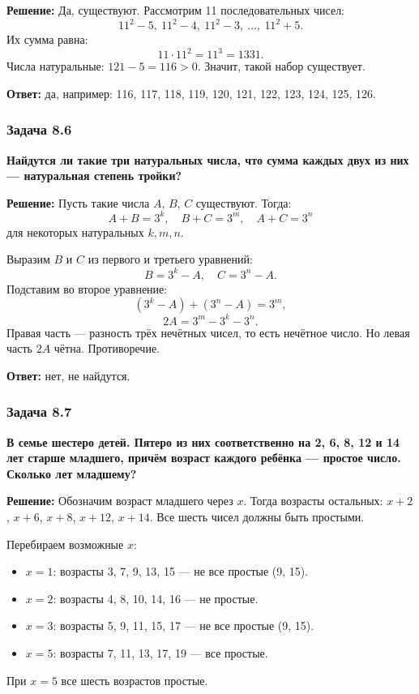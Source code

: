\documentclass[12pt, a4paper]{article}
\begin{document}
\textbf{Решение:}
Да, существуют. Рассмотрим 11 последовательных чисел:
\[
11^2 - 5,\ 11^2 - 4,\ 11^2 - 3,\ \ldots,\ 11^2 + 5.
\]
Их сумма равна:
\[
11 \cdot 11^2 = 11^3 = 1331.
\]
Числа натуральные: $121 - 5 = 116 > 0$. Значит, такой набор существует.

\textbf{Ответ:} да, например: 116, 117, 118, 119, 120, 121, 122, 123, 124, 125, 126.

\subsubsection*{Задача 8.6}
\textbf{Найдутся ли такие три натуральных числа, что сумма каждых двух из них — натуральная степень тройки?}

\textbf{Решение:}
Пусть такие числа $A$, $B$, $C$ существуют. Тогда:
\[
A + B = 3^k, \quad B + C = 3^m, \quad A + C = 3^n
\]
для некоторых натуральных $k, m, n$.

Выразим $B$ и $C$ из первого и третьего уравнений:
\[
B = 3^k - A, \quad C = 3^n - A.
\]
Подставим во второе уравнение:
\[
(3^k - A) + (3^n - A) = 3^m,
\]
\[
2A = 3^m - 3^k - 3^n.
\]
Правая часть — разность трёх нечётных чисел, то есть нечётное число. Но левая часть $2A$ чётна. Противоречие.

\textbf{Ответ:} нет, не найдутся.

\subsubsection*{Задача 8.7}
\textbf{В семье шестеро детей. Пятеро из них соответственно на 2, 6, 8, 12 и 14 лет старше младшего, причём возраст каждого ребёнка — простое число. Сколько лет младшему?}

\textbf{Решение:}
Обозначим возраст младшего через $x$. Тогда возрасты остальных: $x+2$, $x+6$, $x+8$, $x+12$, $x+14$. Все шесть чисел должны быть простыми.

Перебираем возможные $x$:
\begin{itemize}
    \item $x = 1$: возрасты 3, 7, 9, 13, 15 — не все простые (9, 15).
    \item $x = 2$: возрасты 4, 8, 10, 14, 16 — не простые.
    \item $x = 3$: возрасты 5, 9, 11, 15, 17 — не все простые (9, 15).
    \item $x = 5$: возрасты 7, 11, 13, 17, 19 — все простые.
\end{itemize}
При $x = 5$ все шесть возрастов простые.
\end{document}
